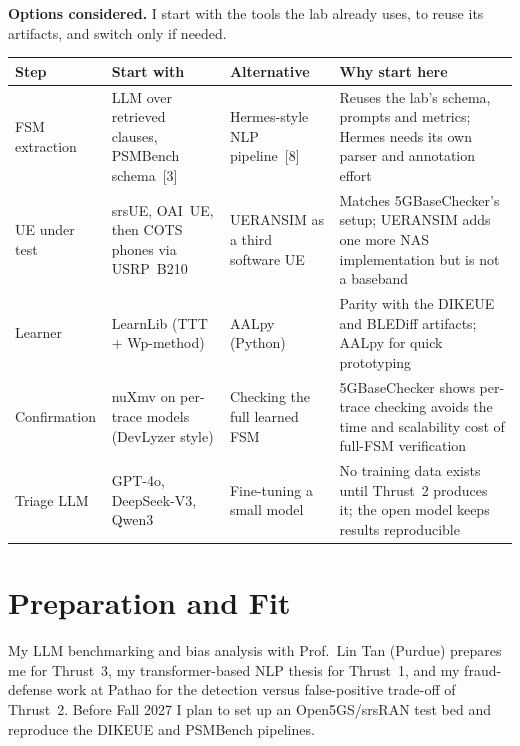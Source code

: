 \documentclass[11pt,letterpaper]{article}
\begin{document}
\textbf{Options considered.} I start with the tools the lab already uses, to reuse its artifacts, and switch only if needed.

{\small
\begin{tabularx}{\textwidth}{@{}>{\raggedright\arraybackslash}p{2.1cm} >{\raggedright\arraybackslash}p{3.6cm} >{\raggedright\arraybackslash}p{3.3cm} X@{}}
\toprule
\textbf{Step} & \textbf{Start with} & \textbf{Alternative} & \textbf{Why start here} \\
\midrule
FSM extraction & LLM over retrieved clauses, PSMBench schema~[3] & Hermes-style NLP pipeline~[8] & Reuses the lab's schema, prompts and metrics; Hermes needs its own parser and annotation effort \\
UE under test & srsUE, OAI~UE, then COTS phones via USRP~B210 & UERANSIM as a third software UE & Matches 5GBaseChecker's setup; UERANSIM adds one more NAS implementation but is not a baseband \\
Learner & LearnLib (TTT + Wp-method) & AALpy (Python) & Parity with the DIKEUE and BLEDiff artifacts; AALpy for quick prototyping \\
Confirmation & nuXmv on per-trace models (DevLyzer style) & Checking the full learned FSM & 5GBaseChecker shows per-trace checking avoids the time and scalability cost of full-FSM verification \\
Triage LLM & GPT-4o, DeepSeek-V3, Qwen3 & Fine-tuning a small model & No training data exists until Thrust~2 produces it; the open model keeps results reproducible \\
\bottomrule
\end{tabularx}
}

\section{Preparation and Fit}
My LLM benchmarking and bias analysis with Prof.\ Lin Tan (Purdue) prepares me for Thrust~3, my transformer-based NLP thesis for Thrust~1, and my fraud-defense work at Pathao for the detection versus false-positive trade-off of Thrust~2. Before Fall 2027 I plan to set up an Open5GS/srsRAN test bed and reproduce the DIKEUE and PSMBench pipelines.
\end{document}
